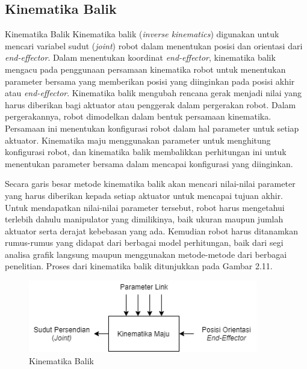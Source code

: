 \subsection{Kinematika Balik}
Kinematika Balik Kinematika balik (\textit{inverse kinematics}) digunakan untuk mencari variabel sudut (\textit{joint}) robot dalam menentukan posisi dan orientasi dari \textit{end-effector}. Dalam menentukan koordinat \textit{end-effector}, kinematika balik mengacu pada penggunaan persamaan kinematika robot untuk menentukan parameter bersama yang memberikan posisi yang diinginkan pada posisi akhir atau \textit{end-effector}. Kinematika balik mengubah rencana gerak menjadi nilai yang harus diberikan bagi aktuator atau penggerak dalam pergerakan robot.  Dalam pergerakannya, robot dimodelkan dalam bentuk persamaan kinematika. Persamaan ini menentukan konfigurasi robot dalam hal parameter untuk setiap aktuator. Kinematika maju menggunakan parameter untuk menghitung konfigurasi robot, dan kinematika balik membalikkan perhitungan ini untuk menentukan parameter bersama dalam mencapai konfigurasi yang diinginkan. 

Secara garis besar metode kinematika balik akan mencari nilai-nilai parameter yang harus diberikan kepada setiap aktuator untuk mencapai tujuan akhir. Untuk mendapatkan nilai-nilai parameter tersebut, robot harus mengetahui terlebih dahulu manipulator yang dimilikinya, baik ukuran maupun jumlah aktuator serta derajat kebebasan yang ada. Kemudian robot harus ditanamkan rumus-rumus yang didapat dari berbagai model perhitungan, baik dari segi analisa grafik langsung maupun menggunakan metode-metode dari berbagai penelitian. Proses dari kinematika balik ditunjukkan pada Gambar 2.11.

	\begin{figure}[H]
	\centering
	\includegraphics[width=10cm]{gambar/kinematika_balik.png}
	\caption{Kinematika Balik}
\end{figure}

